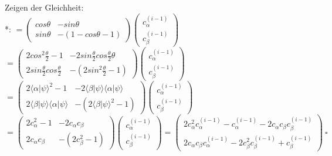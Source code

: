 \documentclass[a4paper]{scrartcl}
\begin{document}
\begin{enumerate}[a)]
Zeigen der Gleichheit:\\
*: $= \begin{pmatrix} cos \theta & -sin \theta\\ sin \theta & -(1-cos \theta-1) \end{pmatrix} \begin{pmatrix} c_{\alpha}^{(i-1)}\\ c_{\beta}^{(i-1)}\end{pmatrix}$\\
$= \begin{pmatrix} 2 cos^2 \frac{\theta}{2}-1 & -2 sin \frac{\theta}{2} cos \frac{\theta}{2} \theta\\ 2 sin \frac{\theta}{2} cos \frac{\theta}{2} & -(2 sin^2 \frac{\theta}{2}-1) \end{pmatrix} \begin{pmatrix} c_{\alpha}^{(i-1)}\\ c_{\beta}^{(i-1)}\end{pmatrix}$\\
$= \begin{pmatrix} 2 \langle \alpha | \psi \rangle^2 -1 & -2 \langle \beta | \psi \rangle \langle \alpha | \psi \rangle \\ 2 \langle \beta | \psi \rangle \langle \alpha | \psi \rangle & -(2 \langle \beta | \psi \rangle^2 -1) \end{pmatrix} \begin{pmatrix} c_{\alpha}^{(i-1)}\\ c_{\beta}^{(i-1)}\end{pmatrix}$\\
$= \begin{pmatrix} 2 c_{\alpha}^2 -1 & -2 c_{\alpha}c_{\beta} \\ 2 c_{\alpha}c_{\beta} & -(2 c_{\beta}^2 -1) \end{pmatrix} \begin{pmatrix} c_{\alpha}^{(i-1)}\\ c_{\beta}^{(i-1)}\end{pmatrix}
= \begin{pmatrix} 2c_{\alpha}^2 c_{\alpha}^{(i-1)} -c_{\alpha}^{(i-1)} - 2c_{\alpha}c_{\beta} c_{\beta}^{(i-1)} \\ 2c_{\alpha}c_{\beta} c_{\alpha}^{(i-1)} - 2c_{\beta}^2 c_{\beta}^{(i-1)} +c_{\beta}^{(i-1)}\end{pmatrix}~\square$

\end{enumerate}


\newpage
\end{document}
